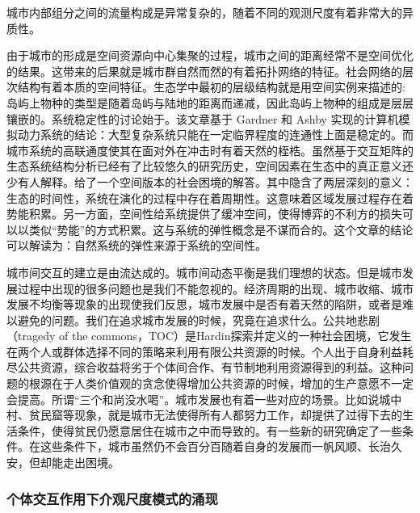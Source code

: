 城市内部组分之间的流量构成是异常复杂的，随着不同的观测尺度有着非常大的异质性\cite{masucci2013gravity}。


由于城市的形成是空间资源向中心集聚的过程，城市之间的距离经常不是空间优化的结果。这带来的后果就是城市群自然而然的有着拓扑网络的特征。社会网络的层次结构有着本质的空间特征。生态学中最初的层级结构就是用空间实例来描述的:岛屿上物种的类型是随着岛屿与陆地的距离而递减，因此岛屿上物种的组成是层层镶嵌的。系统稳定性的讨论始于\cite{may1972will}。该文章基于 Gardner 和 Ashby 实现的计算机模拟动力系统的结论：大型复杂系统只能在一定临界程度的连通性上面是稳定的。而城市系统的高联通度使其在面对外在冲击时有着天然的桎梏。虽然基于交互矩阵的生态系统结构分析已经有了比较悠久的研究历史，空间因素在生态中的真正意义还少有人解释。\cite{lin2019spatial}给了一个空间版本的社会困境的解答。其中隐含了两层深刻的意义：生态的时间性，系统在演化的过程中存在着周期性。这意味着区域发展过程存在着势能积累。另一方面，空间性给系统提供了缓冲空间，使得博弈的不利方的损失可以以类似“势能”的方式积累。这与系统的弹性\cite{gao2016universal}概念是不谋而合的。这个文章的结论可以解读为：自然系统的弹性来源于系统的空间性。

城市间交互的建立是由流达成的。城市间动态平衡是我们理想的状态。但是城市发展过程中出现的很多问题也是我们不能忽视的。经济周期的出现、城市收缩、城市发展不均衡等现象的出现使我们反思，城市发展中是否有着天然的陷阱，或者是难以避免的问题。我们在追求城市发展的时候，究竟在追求什么。公共地悲剧（tragedy of the commons，TOC）是Hardin\cite{hardin1968tragedy}探索并定义的一种社会困境，它发生在两个人或群体选择不同的策略来利用有限公共资源的时候。个人出于自身利益耗尽公共资源，综合收益将劣于个体间合作、有节制地利用资源得到的利益。这种问题的根源在于人类价值观的贪念使得增加公共资源的时候，增加的生产意愿不一定会提高。所谓“三个和尚没水喝”。城市发展也有着一些对应的场景。比如说城中村、贫民窟等现象，就是城市无法使得所有人都努力工作，却提供了过得下去的生活条件，使得贫民仍愿意居住在城市之中而导致的。有一些新的研究确定了一些条件。在这些条件下，城市虽然仍不会百分百随着自身的发展而一帆风顺、长治久安，但却能走出困境。


\subsubsection{个体交互作用下介观尺度模式的涌现}

